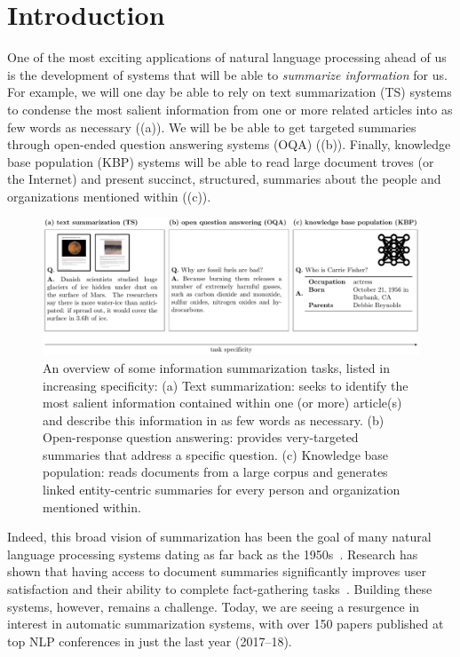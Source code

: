 
\chapter{\label{chap:intro} Introduction}

One of the most exciting applications of natural language processing ahead of us is the development of systems that will be able to \textit{summarize information} for us.
For example, we will one day be able to rely on 
text summarization (TS) systems to condense the most salient information from one or more related articles into as few words as necessary ((a)).
We will be be able to get targeted summaries through open-ended question answering systems (OQA) ((b)).
Finally, knowledge base population (KBP) systems  will be able to read large document troves (or the Internet) and present succinct, structured, summaries about the people and organizations mentioned within ((c)).

\begin{figure}
  \centering
  \includegraphics[width=\textwidth]{figures/overview}

  \caption[Overview of some information summarization tasks]{\label{fig:intro:overview} An overview of some information summarization tasks, listed in increasing specificity:
  (a) Text summarization: seeks to identify the most salient information contained within one (or more) article(s) and describe this information in as few words as necessary.
  (b) Open-response question answering: provides very-targeted summaries that address a specific question.
  (c) Knowledge base population: reads documents from a large corpus and generates linked entity-centric summaries for every person and organization mentioned within.
  }
\end{figure}

Indeed, this broad vision of summarization has been the goal of many natural language processing systems dating as far back as the 1950s~\citep{luhn1958automatic}.
Research has shown that having access to document summaries significantly improves user satisfaction and their ability to complete fact-gathering tasks~\citep{mani1999tipster, mckeown2005summaries}. 
Building these systems, however, remains a challenge.
Today, we are seeing a resurgence in interest in automatic summarization systems, with over 150 papers published at top NLP conferences in just the last year (2017--18).

